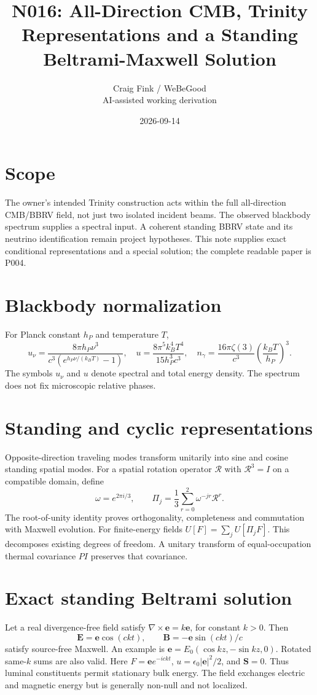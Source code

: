 \documentclass[11pt]{article}
\title{N016: All-Direction CMB, Trinity Representations and a Standing Beltrami-Maxwell Solution}
\author{Craig Fink / WeBeGood\\AI-assisted working derivation}
\date{2026-09-14}
\begin{document}
\maketitle
\section{Scope}
The owner's intended Trinity construction acts within the full all-direction CMB/BBRV field, not just two isolated incident beams. The observed blackbody spectrum supplies a spectral input. A coherent standing BBRV state and its neutrino identification remain project hypotheses. This note supplies exact conditional representations and a special solution; the complete readable paper is P004.
\section{Blackbody normalization}
For Planck constant $h_P$ and temperature $T$,
\[
u_\nu=\frac{8\pi h_P\nu^3}{c^3(e^{h_P\nu/(k_BT)}-1)},\quad
u=\frac{8\pi^5k_B^4T^4}{15h_P^3c^3},\quad
n_\gamma=\frac{16\pi\zeta(3)}{c^3}\left(\frac{k_BT}{h_P}\right)^3.
\]
The symbols $u_\nu$ and $u$ denote spectral and total energy density. The spectrum does not fix microscopic relative phases.
\section{Standing and cyclic representations}
Opposite-direction traveling modes transform unitarily into sine and cosine standing spatial modes. For a spatial rotation operator $\mathcal R$ with $\mathcal R^3=I$ on a compatible domain, define
\[
\omega=e^{2\pi i/3},\qquad\Pi_j=\frac13\sum_{r=0}^{2}\omega^{-jr}\mathcal R^r.
\]
The root-of-unity identity proves orthogonality, completeness and commutation with Maxwell evolution. For finite-energy fields $U[F]=\sum_jU[\Pi_jF]$. This decomposes existing degrees of freedom. A unitary transform of equal-occupation thermal covariance $P I$ preserves that covariance.
\section{Exact standing Beltrami solution}
Let a real divergence-free field satisfy $\nabla\times\mathbf e=k\mathbf e$, for constant $k>0$. Then
\[
\mathbf E=\mathbf e\cos(ckt),\qquad\mathbf B=-\mathbf e\sin(ckt)/c
\]
satisfy source-free Maxwell. An example is $\mathbf e=E_0(\cos kz,-\sin kz,0)$. Rotated same-$k$ sums are also valid. Here $F=\mathbf e e^{-ickt}$, $u=\epsilon_0|\mathbf e|^2/2$, and $\mathbf S=0$. Thus luminal constituents permit stationary bulk energy. The field exchanges electric and magnetic energy but is generally non-null and not localized.
\end{document}
